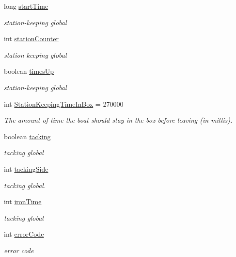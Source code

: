 \begin{DoxyCompactItemize}
long \hyperlink{group__group1_ga8ad49a66e91d8658c5f1f7dbcbcbbd2f}{start\-Time}
\begin{DoxyCompactList}\small\item\em station-\/keeping global \end{DoxyCompactList}\item 
int \hyperlink{group__group1_gaffc96d075c8796c3d5ef3dc5824c0819}{station\-Counter}
\begin{DoxyCompactList}\small\item\em station-\/keeping global \end{DoxyCompactList}\item 
boolean \hyperlink{group__group1_gaf453f5fa6c0df67707ca308a2fc80ca1}{times\-Up}
\begin{DoxyCompactList}\small\item\em station-\/keeping global \end{DoxyCompactList}\item 
int \hyperlink{group__group1_gabe157ddfb46568e2de8b041f54ac6d98}{\-Station\-Keeping\-Time\-In\-Box} = 270000
\begin{DoxyCompactList}\small\item\em \-The amount of time the boat should stay in the box before leaving (in millis). \end{DoxyCompactList}\item 
boolean \hyperlink{group__group1_gab23a7a79ede8d141fa92f4475d36fb24}{tacking}
\begin{DoxyCompactList}\small\item\em tacking global \end{DoxyCompactList}\item 
int \hyperlink{group__group1_gabdfa4a25e22806c47eebd4c9826ef7a6}{tacking\-Side}
\begin{DoxyCompactList}\small\item\em tacking global. \end{DoxyCompactList}\item 
int \hyperlink{group__group1_ga332365589e9af9d8ec4d1c5663034132}{iron\-Time}
\begin{DoxyCompactList}\small\item\em tacking global \end{DoxyCompactList}\item 
int \hyperlink{group__group1_gab675a39a0c7f0587be9ae6734db7ac80}{error\-Code}
\begin{DoxyCompactList}\small\item\em error code \end{DoxyCompactList}\end{DoxyCompactItemize}


